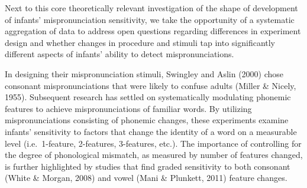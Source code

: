 \documentclass[man]{apa6}
\theoremstyle{definition}
\theoremstyle{definition}
\theoremstyle{definition}
\theoremstyle{remark}
\begin{document}
Next to this core theoretically relevant investigation of the shape of
development of infants' mispronunciation sensitivity, we take the
opportunity of a systematic aggregation of data to address open
questions regarding differences in experiment design and whether changes
in procedure and stimuli tap into significantly different aspects of
infants' ability to detect mispronunciations.

In designing their mispronunciation stimuli, Swingley and Aslin (2000)
chose consonant mispronunciations that were likely to confuse adults
(Miller \& Nicely, 1955). Subsequent research has settled on
systematically modulating phonemic features to achieve mispronunciations
of familiar words. By utilizing mispronunciations consisting of phonemic
changes, these experiments examine infants' sensitivity to factors that
change the identity of a word on a measurable level (i.e.~1-feature,
2-features, 3-features, etc.). The importance of controlling for the
degree of phonological mismatch, as measured by number of features
changed, is further highlighted by studies that find graded sensitivity
to both consonant (White \& Morgan, 2008) and vowel (Mani \& Plunkett,
2011) feature changes.
\end{document}
